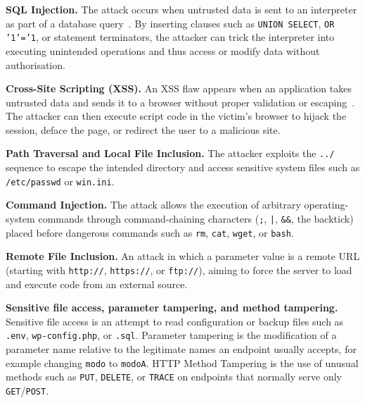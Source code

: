 \begin{romanlist}
  \item \textbf{SQL Injection.} The attack occurs when untrusted data is
        sent to an interpreter as part of a database query~\cite{pham2016}.
        By inserting clauses such as \texttt{UNION SELECT}, \texttt{OR
        '1'='1}, or statement terminators, the attacker can trick the
        interpreter into executing unintended operations and thus access or
        modify data without authorisation.

  \item \textbf{Cross-Site Scripting (XSS).} An XSS flaw appears when an
        application takes untrusted data and sends it to a browser without
        proper validation or escaping~\cite{pham2016}. The attacker can
        then execute script code in the victim's browser to hijack the
        session, deface the page, or redirect the user to a malicious site.

  \item \textbf{Path Traversal and Local File Inclusion.} The attacker
        exploits the \texttt{../} sequence to escape the intended directory
        and access sensitive system files such as \texttt{/etc/passwd} or
        \texttt{win.ini}.

  \item \textbf{Command Injection.} The attack allows the execution of
        arbitrary operating-system commands through command-chaining
        characters (\texttt{;}, \texttt{|}, \texttt{\&\&}, the backtick)
        placed before dangerous commands such as \texttt{rm}, \texttt{cat},
        \texttt{wget}, or \texttt{bash}.

  \item \textbf{Remote File Inclusion.} An attack in which a parameter
        value is a remote URL (starting with \texttt{http://},
        \texttt{https://}, or \texttt{ftp://}), aiming to force the server
        to load and execute code from an external source.

  \item \textbf{Sensitive file access, parameter tampering, and method
        tampering.} Sensitive file access is an attempt to read
        configuration or backup files such as \texttt{.env},
        \texttt{wp-config.php}, or \texttt{.sql}. Parameter tampering is the
        modification of a parameter name relative to the legitimate names an
        endpoint usually accepts, for example changing \texttt{modo} to
        \texttt{modoA}. HTTP Method Tampering is the use of unusual methods
        such as \texttt{PUT}, \texttt{DELETE}, or \texttt{TRACE} on
        endpoints that normally serve only \texttt{GET}/\texttt{POST}.
\end{romanlist}


